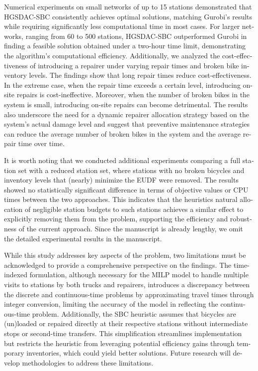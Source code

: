 \documentclass[
  english,
]{article}
\begin{document}
\begin{otherlanguage}{english}
\protect{}\label{p0695}
Numerical experiments on small networks of up to 15 stations demonstrated that HGSDAC-SBC
consistently achieves optimal solutions, matching Gurobi's results while requiring significantly
less computational time in most cases. For larger networks, ranging from 60 to 500 stations,
HGSDAC-SBC outperformed Gurobi in finding a feasible solution obtained under a two-hour time limit,
demonstrating the algorithm's computational efficiency. Additionally, we analyzed the
cost-effectiveness of introducing a repairer under varying repair times and broken bike inventory
levels. The findings show that long repair times reduce cost-effectiveness. In the extreme case,
when the repair time exceeds a certain level, introducing on-site repairs is cost-ineffective.
Moreover, when the number of broken bikes in the system is small, introducing on-site repairs can
become detrimental. The results also underscore the need for a dynamic repairer allocation strategy
based on the system's actual damage level and suggest that preventive maintenance strategies can
reduce the average number of broken bikes in the system and the average repair time over time.

\protect{}\label{p0700}
It is worth noting that we conducted additional experiments comparing a full station set with a
reduced station set, where stations with no broken bicycles and inventory levels that (nearly)
minimize the EUDF were removed. The results showed no statistically significant difference in terms
of objective values or CPU times between the two approaches. This indicates that the
heuristic\textquotesingle s natural allocation of negligible station budgets to such stations
achieves a similar effect to explicitly removing them from the problem, supporting the efficiency
and robustness of the current approach. Since the manuscript is already lengthy, we omit the
detailed experimental results in the manuscript.

\protect{}\label{p0705}
While this study addresses key aspects of the problem, two limitations must be acknowledged to
provide a comprehensive perspective on the findings. The time-indexed formulation, although
necessary for the MILP model to handle multiple visits to stations by both trucks and repairers,
introduces a discrepancy between the discrete and continuous-time problems by approximating travel
times through integer conversion, limiting the accuracy of the model in reflecting the
continuous-time problem. Additionally, the SBC heuristic assumes that bicycles are (un)loaded or
repaired directly at their respective stations without intermediate stops or second-time transfers.
This simplification streamlines implementation but restricts the heuristic from leveraging potential
efficiency gains through temporary inventories, which could yield better solutions. Future research
will develop methodologies to address these limitations.


\end{otherlanguage}
\end{document}
